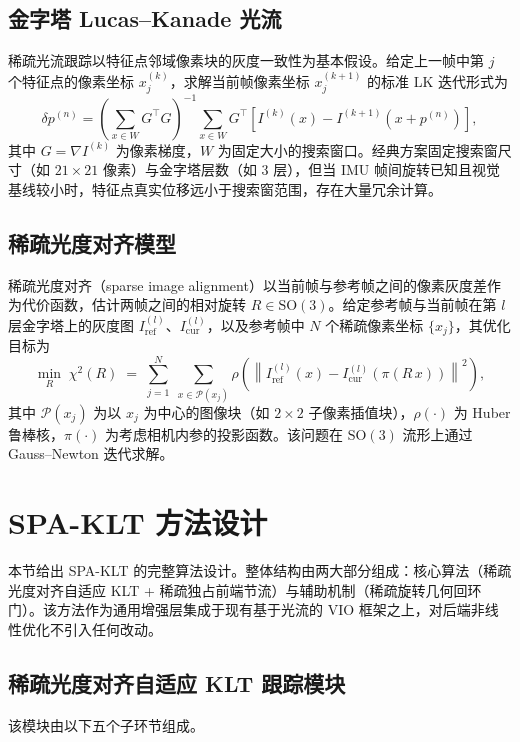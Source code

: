 \documentclass[letterpaper,journal]{IEEEtran}
\begin{document}
\subsection{金字塔 Lucas--Kanade 光流}
稀疏光流跟踪以特征点邻域像素块的灰度一致性为基本假设。给定上一帧中第 $j$ 个特征点的像素坐标 $x_{j}^{(k)}$，求解当前帧像素坐标 $x_{j}^{(k+1)}$ 的标准 LK 迭代形式为
\begin{equation}
\delta p^{(n)} = \left( \sum_{x\in W} G^{\top} G \right)^{-1} \!\! \sum_{x\in W} G^{\top}\!\left[ I^{(k)}(x) - I^{(k+1)}(x + p^{(n)}) \right],
\label{eq:lk}
\end{equation}
其中 $G = \nabla I^{(k)}$ 为像素梯度，$W$ 为固定大小的搜索窗口。经典方案固定搜索窗尺寸（如 $21{\times}21$ 像素）与金字塔层数（如 3 层），但当 IMU 帧间旋转已知且视觉基线较小时，特征点真实位移远小于搜索窗范围，存在大量冗余计算。

\subsection{稀疏光度对齐模型}
稀疏光度对齐（sparse image alignment）以当前帧与参考帧之间的像素灰度差作为代价函数，估计两帧之间的相对旋转 $R \in \mathrm{SO}(3)$。给定参考帧与当前帧在第 $l$ 层金字塔上的灰度图 $I_{\mathrm{ref}}^{(l)}$、$I_{\mathrm{cur}}^{(l)}$，以及参考帧中 $N$ 个稀疏像素坐标 $\{x_j\}$，其优化目标为
\begin{equation}
\min_{R}\; \chi^2(R) \;=\; \sum_{j=1}^{N}\; \sum_{x \in \mathcal{P}(x_j)} \rho\!\left( \left\| I_{\mathrm{ref}}^{(l)}(x) - I_{\mathrm{cur}}^{(l)}\!\left( \pi(R\, x) \right) \right\|^2 \right),
\label{eq:spa_obj}
\end{equation}
其中 $\mathcal{P}(x_j)$ 为以 $x_j$ 为中心的图像块（如 $2{\times}2$ 子像素插值块），$\rho(\cdot)$ 为 Huber 鲁棒核，$\pi(\cdot)$ 为考虑相机内参的投影函数。该问题在 $\mathrm{SO}(3)$ 流形上通过 Gauss--Newton 迭代求解。

\section{SPA-KLT 方法设计}
\label{sec:system}

本节给出 SPA-KLT 的完整算法设计。整体结构由两大部分组成：核心算法（稀疏光度对齐自适应 KLT + 稀疏独占前端节流）与辅助机制（稀疏旋转几何回环门）。该方法作为通用增强层集成于现有基于光流的 VIO 框架之上，对后端非线性优化不引入任何改动。

\subsection{稀疏光度对齐自适应 KLT 跟踪模块}
该模块由以下五个子环节组成。
\end{document}
